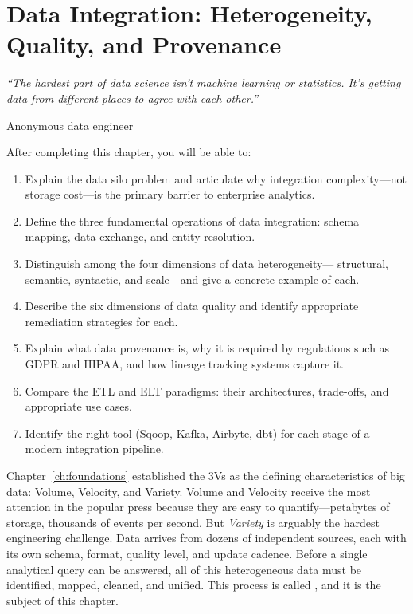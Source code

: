 
\chapter{Data Integration: Heterogeneity, Quality, and Provenance}
\label{ch:integration}

\epigraph{\textit{``The hardest part of data science isn't machine learning or statistics.
It's getting data from different places to agree with each other.''}}{Anonymous data engineer}

\vspace{4pt}

\begin{chapterlearning}
After completing this chapter, you will be able to:
\begin{enumerate}
  \item Explain the data silo problem and articulate why integration
        complexity---not storage cost---is the primary barrier to
        enterprise analytics.
  \item Define the three fundamental operations of data integration:
        schema mapping, data exchange, and entity resolution.
  \item Distinguish among the four dimensions of data heterogeneity---
        structural, semantic, syntactic, and scale---and give a concrete
        example of each.
  \item Describe the six dimensions of data quality and identify
        appropriate remediation strategies for each.
  \item Explain what data provenance is, why it is required by regulations
        such as GDPR and HIPAA, and how lineage tracking systems capture it.
  \item Compare the ETL and ELT paradigms: their architectures, trade-offs,
        and appropriate use cases.
  \item Identify the right tool (Sqoop, Kafka, Airbyte, dbt) for each
        stage of a modern integration pipeline.
\end{enumerate}
\end{chapterlearning}

\bigskip

Chapter~\ref{ch:foundations} established the 3Vs as the defining
characteristics of big data: Volume, Velocity, and Variety. Volume and
Velocity receive the most attention in the popular press because they are
easy to quantify---petabytes of storage, thousands of events per second.
But \emph{Variety} is arguably the hardest engineering challenge. Data
arrives from dozens of independent sources, each with its own schema,
format, quality level, and update cadence. Before a single analytical
query can be answered, all of this heterogeneous data must be identified,
mapped, cleaned, and unified. This process is called , and it is the subject of this chapter.

